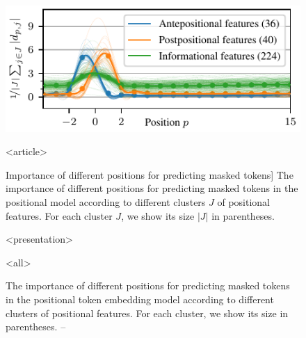 \begin{figure}

\centering

\includegraphics[width=0.7\columnwidth]{positional-features}

\vspace{-0.2cm}

\mode
<article>

\caption
  [Importance of different positions for predicting masked tokens]%
  {The importance of different positions for predicting masked tokens in
   the positional model according to different clusters $J$ of positional
   features. For each cluster $J$, we show its size $|J|$ in parentheses.
   \cite[Figure 4]{novotny2021when}}

\protect{}
\protect{}
\protect{}

\mode
<presentation>

\caption
  {The importance of different positions for predicting masked tokens in
   the positional token embedding model according to different clusters of
   positional features. For each cluster, we show its size in parentheses.
   -- \textcite[Figure 4]{novotny2021when}}

\mode
<all>

\label{fig:position-independent-token-embeddings-interpretability}
\end{figure}
